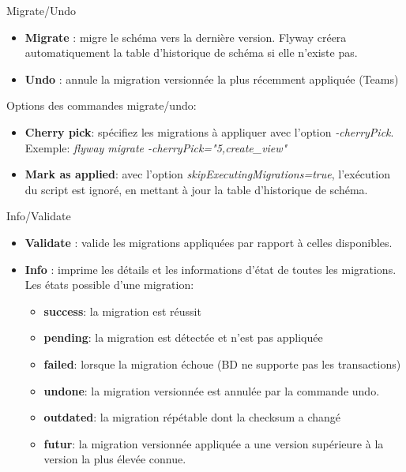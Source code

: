 \documentclass[slidestop,compress,11pt,xcolor=dvipsnames,french]{beamer}
\begin{document}
\begin{frame}{Migrate/Undo}
\begin{itemize}
 \item \textbf{Migrate} : migre le schéma vers la dernière version. Flyway créera automatiquement la table d'historique de schéma si elle n'existe pas.
 \item \textbf{Undo} : annule la migration versionnée la plus récemment appliquée (Teams)
\end{itemize}
\vspace{1cm}
Options des commandes migrate/undo:
\begin{itemize}
 \item \textbf{Cherry pick}: spécifiez les migrations à appliquer avec l'option \textit{-cherryPick}. Exemple: \textit{flyway migrate -cherryPick="5,create\_view"}
 \item \textbf{Mark as applied}: avec l'option \textit{skipExecutingMigrations=true}, l'exécution du script est ignoré, en mettant à jour la table d'historique de schéma.
\end{itemize}
\end{frame}
\begin{frame}{Info/Validate}
\begin{itemize}
 \item \textbf{Validate} : valide les migrations appliquées par rapport à celles disponibles.
 \item \textbf{Info} : imprime les détails et les informations d'état de toutes les migrations. Les états possible d'une migration:
    \begin{itemize}
        \item \textbf{success}: la migration est réussit
        \item \textbf{pending}: la migration est détectée et n'est pas appliquée 
        \item \textbf{failed}: lorsque la migration échoue (BD ne supporte pas les transactions) 
        \item \textbf{undone}: la migration versionnée est annulée par la commande undo.
        \item \textbf{outdated}: la migration répétable dont la checksum a changé
        \item \textbf{futur}:  la migration versionnée appliquée a une version supérieure à la version la plus élevée connue.
    \end{itemize}
\end{itemize}
\end{frame}
\end{document}

